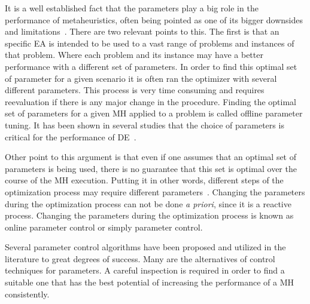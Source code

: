 It is a well established fact that the parameters play a big role in the
performance of metaheuristics, often being pointed as one of its bigger
downsides and limitations~\cite{parpinelli18review}.
There are two relevant points to this.
The first is that an specific \ac{EA} is intended to be used to a vast range of
problems and instances of that problem. Where each problem and its instance
may have a better performance with a different set of parameters. In order
to find this optimal set of parameter for a given scenario it is often
ran the optimizer with several different parameters. This process is
very time consuming and requires reevaluation if there is any major
change in the procedure. Finding the optimal set of parameters for a given
\ac{MH} applied to a problem is called offline parameter tuning.
It has been shown in several studies that the choice of parameters
is critical for the performance of \ac{DE}~\cite{karafotias2015parameter}.

Other point to this argument is that even if one assumes that an
optimal set of parameters is being used, there is no guarantee that
this set is optimal over the course of the \ac{MH} execution. Putting it
in other words, different steps of the optimization process may require
different parameters~\cite{narloch2017protein}.
Changing the parameters during the optimization
process can not be done \textit{a priori}, since it is a reactive process.
Changing the parameters during the optimization process is known as
online parameter control or simply parameter control.

Several parameter control algorithms have been proposed and utilized
in the literature to great degrees of success. Many are the alternatives
of control techniques for parameters. A careful inspection is
required in order to find a suitable one that has the best
potential of increasing the performance of a \ac{MH} consistently.

